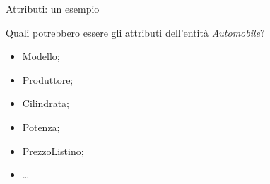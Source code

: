 \begin{frame}{Attributi: un esempio}
\begin{minipage}[t]{0.7\linewidth}
    Quali potrebbero essere gli attributi dell'entit\`a \textit{Automobile}?
    \pause
    \begin{itemize}[<+->]
        \item Modello;
        \item Produttore;
        \item Cilindrata;
        \item Potenza;
        \item PrezzoListino;
        \item \ldots
    \end{itemize}
\end{minipage}%
\begin{minipage}[t]{0.2\linewidth}
    \pause
\end{minipage}
\end{frame}
%
